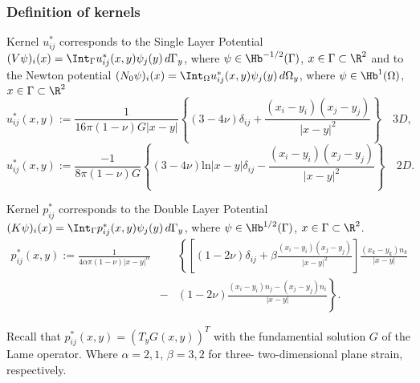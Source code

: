 \subsubsection{Definition of kernels}

\begin{definition} Kernel $u^{*}_{ij}$ corresponds to the Single Layer Potential $(V\psi)_{i}(x)=\Int_{\Gamma}u^{*}_{ij}(x,y)\psi_{j}(y)\,d\Gamma_{y}$, where $\psi\in \Hb^{-1/2}(\Gamma)$, $x\in\Gamma\subset \R^{2}$ and to the Newton potential $(N_{0}\psi)_{i}(x)=\Int_{\Omega}u^{*}_{ij}(x,y)\psi_{j}(y)\,d\Omega_{y}$, where $\psi\in \Hb^{1}(\Omega)$, $x\in\Gamma\subset \R^{2}$ 
\begin{equation}\nonumber
u^{*}_{ij}(x,y):=\frac{1}{16 \pi (1-\nu)G |x-y|}\left\{ (3-4\nu)\delta_{ij}+\frac{(x_i-y_i)(x_j-y_j)}{|x-y|^2}\right\} \quad 3D,
\end{equation}
\begin{equation}\nonumber
u^{*}_{ij}(x,y):=\frac{-1}{8 \pi (1-\nu)G }\left\{ (3-4\nu)\mbox{ln}|x-y|\delta_{ij}-\frac{(x_i-y_i)(x_j-y_j)}{|x-y|^2}\right\} \quad 2D.
\end{equation}
\end{definition}

\begin{definition}Kernel  $p^{*}_{ij}$ corresponds to the Double Layer Potential $(K\psi)_{i}(x)=\Int_{\Gamma}p^{*}_{ij}(x,y)\psi_{j}(y)\,d\Gamma_{y}$, where $\psi\in \Hb^{1/2}(\Gamma)$, $x\in\Gamma\subset \R^{2}$.
\begin{eqnarray}
p^{*}_{ij}(x,y):=\frac{1}{4\alpha\pi(1-\nu)|x-y|^{\alpha}}&&\left\{\left[(1-2\nu)\delta_{ij}+\beta\frac{(x_i-y_i)(x_j-y_j)}{|x-y|^2}\right]\frac{(x_k-y_k)n_k}{|x-y|}\right. \nonumber \\
&-&\left.(1-2\nu)\frac{(x_i-y_i)n_j-(x_j-y_j)n_i}{|x-y|}\right\}. \nonumber
\end{eqnarray}
\end{definition}
Recall that $p^{*}_{ij}(x,y)=\left(T_y G(x,y)\right)^T$ with the fundamential solution $G$ of the Lame operator. Where $\alpha=2,1$, $\beta=3,2$ for three- two-dimensional plane strain, respectively. 


